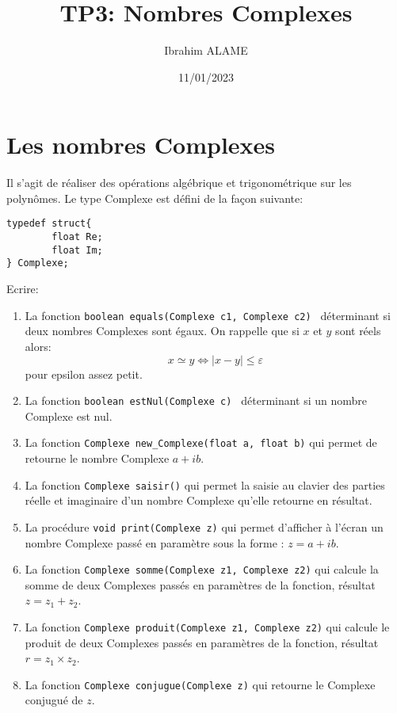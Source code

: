 \documentclass[a4paper]{article}
\title{TP3: Nombres Complexes}
\author{Ibrahim ALAME}
\date{11/01/2023}
\begin{document}
\maketitle

\section*{Les nombres Complexes}
Il s'agit de réaliser des opérations algébrique et trigonométrique sur les polynômes. Le type Complexe est défini de la façon suivante:
\begin{verbatim}
typedef struct{
        float Re;
        float Im;
} Complexe;        
\end{verbatim}
Ecrire:
\begin{enumerate}

\item   La fonction {\tt boolean equals(Complexe c1, Complexe c2) }  déterminant si deux nombres Complexes sont égaux. On rappelle que si $x$ et $y$ sont réels alors: 
\[ x\simeq y \Longleftrightarrow |x-y|\leq \varepsilon\]
pour epsilon assez petit.

\item   La fonction {\tt boolean estNul(Complexe c) }  déterminant si un nombre Complexe est nul.

\item  La fonction {\tt Complexe new\_Complexe(float a, float b)} qui permet de retourne le nombre Complexe  $a+i b$.

\item  La fonction {\tt Complexe saisir()} qui permet la saisie au clavier des parties réelle et imaginaire d'un nombre Complexe qu'elle retourne en résultat.

\item  La procédure {\tt void print(Complexe z)} qui permet d'afficher à l'écran un nombre Complexe passé en paramètre sous la forme : $z=a+ib$.

\item  La fonction {\tt Complexe somme(Complexe z1, Complexe z2)} qui calcule la somme de deux Complexes passés en paramètres de la fonction, résultat $ z=z_1+z_2$.

\item  La fonction {\tt  Complexe produit(Complexe z1, Complexe z2)} qui calcule le produit de deux Complexes passés en paramètres de la fonction, résultat $r=z_1\times z_2$.

\item  La fonction {\tt Complexe conjugue(Complexe z)} qui retourne le Complexe conjugué de $z$.


\end{enumerate}
\end{document}
